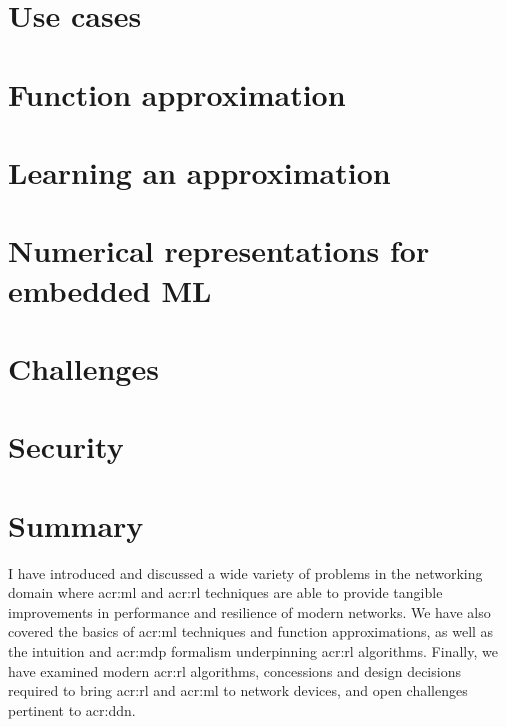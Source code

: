 \section{Use cases}\label{sec:use-cases}%


\section{Function approximation}\label{sec:function-approximation}


\section{Learning an approximation}\label{sec:learning-an-approximation}%


%

\section{Numerical representations for embedded ML}\label{sec:numerical-representations-for-embedded-ml}


\section{Challenges}\label{sec:ddn-challenges}


\section{Security}\label{sec:ddn-security}


\section{Summary}
I have introduced and discussed a wide variety of problems in the networking domain where \gls{acr:ml} and \gls{acr:rl} techniques are able to provide tangible improvements in performance and resilience of modern networks.
We have also covered the basics of \gls{acr:ml} techniques and function approximations, as well as the intuition and \gls{acr:mdp} formalism underpinning \gls{acr:rl} algorithms.
Finally, we have examined modern \gls{acr:rl} algorithms, concessions and design decisions required to bring \gls{acr:rl} and \gls{acr:ml} to network devices, and open challenges pertinent to \gls{acr:ddn}.

